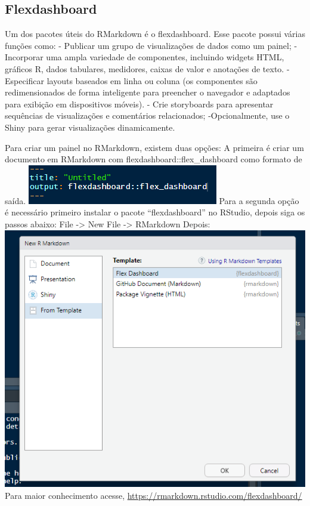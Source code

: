 \documentclass[
]{book}
\begin{document}
\hypertarget{flexdashboard}{%
\subsection{Flexdashboard}\label{flexdashboard}}

Um dos pacotes úteis do RMarkdown é o flexdashboard.
Esse pacote possui várias funções como:
- Publicar um grupo de visualizações de dados como um painel;
- Incorporar uma ampla variedade de componentes, incluindo widgets HTML, gráficos R, dados tabulares, medidores, caixas de valor e anotações de texto.
-Especificar layouts baseados em linha ou coluna (os componentes são redimensionados de forma inteligente para preencher o navegador e adaptados para exibição em dispositivos móveis).
- Crie storyboards para apresentar sequências de visualizações e comentários relacionados;
-Opcionalmente, use o Shiny para gerar visualizações dinamicamente.

Para criar um painel no RMarkdown, existem duas opções:
A primeira é criar um documento em RMarkdown com flexdashboard::flex\_dashboard como formato de saída.
\includegraphics{img/Dash 1.png}
Para a segunda opção é necessário primeiro instalar o pacote ``flexdashboard'' no RStudio, depois siga os passos abaixo:
File -\textgreater{} New File -\textgreater{} RMarkdown
Depois:
\includegraphics{img/Dash 2.png}
Para maior conhecimento acesse, \url{https://rmarkdown.rstudio.com/flexdashboard/}
\end{document}
